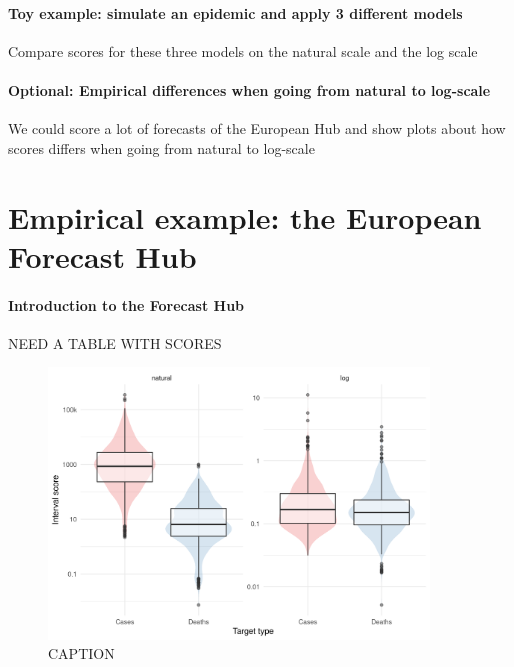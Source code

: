\documentclass{article}
\begin{document}
\paragraph{Toy example: simulate an epidemic and apply 3 different models} Compare scores for these three models on the natural scale and the log scale

\paragraph{Optional: Empirical differences when going from natural to log-scale} 
We could score a lot of forecasts of the European Hub and show plots about how scores differs when going from natural to log-scale


\section{Empirical example: the European Forecast Hub}

\paragraph{Introduction to the Forecast Hub}

NEED A TABLE WITH SCORES

\begin{figure}[h!]
    \centering
    \includegraphics[width=0.9\textwidth]{output/figures/HUB-average-scores.png}
    \caption{CAPTION}
    \label{fig:HUB-average-scores}
\end{figure}
\end{document}
